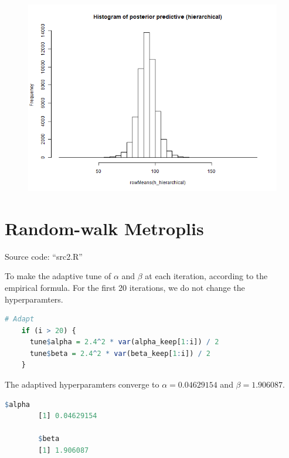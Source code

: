 \documentclass{article}
\begin{document}
{{\begin{figure}[H]
            \caption{}
        \end{figure}
        \begin{figure}[H]
            \centering
            \includegraphics[width = 0.8\linewidth]{posterior_predictive_mean_hierarchical.png}
            \caption{}
        \end{figure}
    }
}

\section*{Random-walk Metroplis}
{
    Source code: ``src2.R''

    To make the adaptive tune of $\alpha$ and $\beta$ at each iteration, according to the empirical formula. For the first 20 iterations, we do not change the hyperparamters.

    \begin{lstlisting}[language=R]
    # Adapt
    if (i > 20) {
      tune$alpha = 2.4^2 * var(alpha_keep[1:i]) / 2
      tune$beta = 2.4^2 * var(beta_keep[1:i]) / 2
    }
    \end{lstlisting}

    The adaptived hyperparamters converge to $\alpha=0.04629154$ and $\beta=1.906087$.
    \begin{lstlisting}[language=R]
        $alpha
        [1] 0.04629154

        $beta
        [1] 1.906087
    \end{lstlisting}
}

\clearpage
\end{document}
